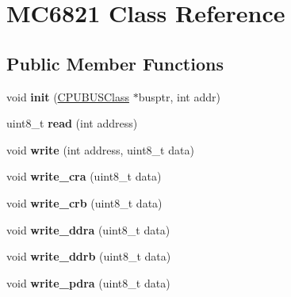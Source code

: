 \hypertarget{classMC6821}{\section{M\-C6821 Class Reference}
\label{classMC6821}
}
\subsection*{Public Member Functions}
\begin{DoxyCompactItemize}
\item 
\hypertarget{classMC6821_a6d0761549107b39339d5cf0dbbd7e8d6}{void {\bfseries init} (\hyperlink{classCPUBUSClass}{C\-P\-U\-B\-U\-S\-Class} $\ast$busptr, int addr)}\label{classMC6821_a6d0761549107b39339d5cf0dbbd7e8d6}

\item 
\hypertarget{classMC6821_adbe5f49d4668adc75086e868a9e61395}{uint8\-\_\-t {\bfseries read} (int address)}\label{classMC6821_adbe5f49d4668adc75086e868a9e61395}

\item 
\hypertarget{classMC6821_a0c93f2696f8d664d41920ffedca18451}{void {\bfseries write} (int address, uint8\-\_\-t data)}\label{classMC6821_a0c93f2696f8d664d41920ffedca18451}

\item 
\hypertarget{classMC6821_abc08642739f403a0e577e20709dd5cf7}{void {\bfseries write\-\_\-cra} (uint8\-\_\-t data)}\label{classMC6821_abc08642739f403a0e577e20709dd5cf7}

\item 
\hypertarget{classMC6821_a3a4cf42739e3051e0c1f7643a4a89c6e}{void {\bfseries write\-\_\-crb} (uint8\-\_\-t data)}\label{classMC6821_a3a4cf42739e3051e0c1f7643a4a89c6e}

\item 
\hypertarget{classMC6821_a9267b5d5a499a79f1cf67736475adbdf}{void {\bfseries write\-\_\-ddra} (uint8\-\_\-t data)}\label{classMC6821_a9267b5d5a499a79f1cf67736475adbdf}

\item 
\hypertarget{classMC6821_a6bb00a4e38b954182bb78a9a8388c11a}{void {\bfseries write\-\_\-ddrb} (uint8\-\_\-t data)}\label{classMC6821_a6bb00a4e38b954182bb78a9a8388c11a}

\item 
\hypertarget{classMC6821_a7d7766c34ae2f153ff2b31d4d472bdd9}{void {\bfseries write\-\_\-pdra} (uint8\-\_\-t data)}\label{classMC6821_a7d7766c34ae2f153ff2b31d4d472bdd9}


\end{DoxyCompactItemize}
